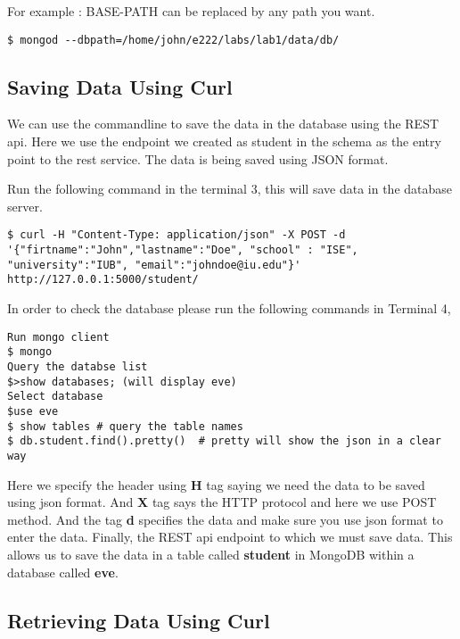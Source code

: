 \documentclass{article}
\begin{document}
For example :
BASE-PATH can be replaced by any path you want. 
\begin{verbatim}
$ mongod --dbpath=/home/john/e222/labs/lab1/data/db/
\end{verbatim}

\subsection{Saving Data Using Curl}

We can use the commandline to save the data in the database using the REST api. Here we use the endpoint we created as student in the schema as the entry point to the rest service. The data is being saved using JSON format. 

Run the following command in the terminal 3, this will save data in the database server. 

\begin{verbatim}
$ curl -H "Content-Type: application/json" -X POST -d 
'{"firtname":"John","lastname":"Doe", "school" : "ISE",
"university":"IUB", "email":"johndoe@iu.edu"}' http://127.0.0.1:5000/student/
\end{verbatim}

\newline

In order to check the database please run the following commands in Terminal 4,

\begin{verbatim}
Run mongo client
$ mongo
Query the databse list
$>show databases; (will display eve)  
Select database
$use eve  
$ show tables # query the table names
$ db.student.find().pretty()  # pretty will show the json in a clear way
\end{verbatim}

\newline

Here we specify the header using \textbf{H} tag saying we need the data to be saved using json format. And \textbf{X} tag says the HTTP protocol and here we use POST method. And the tag \textbf{d} specifies the data and make sure you use json format to enter the data. Finally, the REST api endpoint to which we must save data. This allows us to save the data in a table called \textbf{student} in MongoDB within a database called \textbf{eve}. 

\subsection{Retrieving Data Using Curl}
\end{document}
